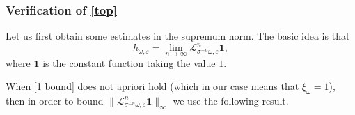 \documentclass[11pt,reqno,a4paper]{article}
\newtheorem{lemma}[theorem]{Lemma}
\theoremstyle{special}
\def\om{\omega}
\begin{document}
\subsubsection{Verification of \eqref{top}}\label{top ver sec}
Let us first obtain some estimates in the   supremum norm.
The basic idea is that 
$$
h_{\omega,\varepsilon}=\lim_{n\to\infty}\mathcal L_{\sigma^{-n}\omega,\varepsilon}^n\textbf{1},
$$
where $\textbf{1}$ is the constant function taking the value $1$. 

When \eqref{1 bound} does not apriori hold (which in our case means that  $\xi_\om=1$), then 
in order to bound $\|\mathcal L_{\sigma^{-n}\omega,\varepsilon}^n\textbf{1}\|_\infty$ we use 
the following result. 
\end{document}
